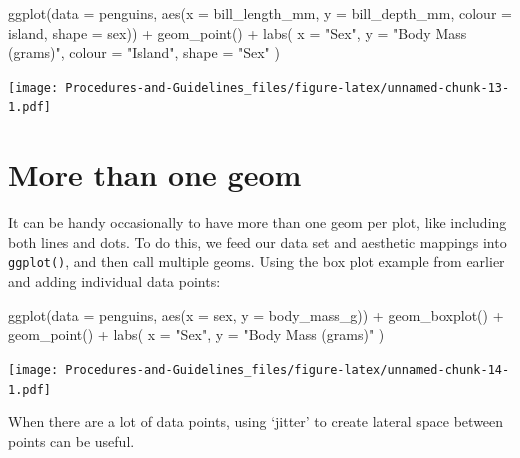 \documentclass[
]{book}
\newenvironment{Shaded}{\begin{snugshade}}{\end{snugshade}}
\newcommand{\AttributeTok}[1]{\textcolor[rgb]{0.77,0.63,0.00}{#1}}
\newcommand{\FunctionTok}[1]{\textcolor[rgb]{0.00,0.00,0.00}{#1}}
\newcommand{\NormalTok}[1]{#1}
\newcommand{\SpecialCharTok}[1]{\textcolor[rgb]{0.00,0.00,0.00}{#1}}
\newcommand{\StringTok}[1]{\textcolor[rgb]{0.31,0.60,0.02}{#1}}
\begin{document}
\begin{Shaded}
\begin{Highlighting}[]
\FunctionTok{ggplot}\NormalTok{(}\AttributeTok{data =}\NormalTok{ penguins, }\FunctionTok{aes}\NormalTok{(}\AttributeTok{x =}\NormalTok{ bill\_length\_mm, }\AttributeTok{y =}\NormalTok{ bill\_depth\_mm, }\AttributeTok{colour =}\NormalTok{ island, }\AttributeTok{shape =}\NormalTok{ sex)) }\SpecialCharTok{+}
  \FunctionTok{geom\_point}\NormalTok{() }\SpecialCharTok{+}
  \FunctionTok{labs}\NormalTok{(}
    \AttributeTok{x =} \StringTok{"Sex"}\NormalTok{,}
    \AttributeTok{y =} \StringTok{"Body Mass (grams)"}\NormalTok{,}
    \AttributeTok{colour =} \StringTok{"Island"}\NormalTok{,}
    \AttributeTok{shape =} \StringTok{"Sex"}
\NormalTok{  )}
\end{Highlighting}
\end{Shaded}

\texttt{[image: Procedures-and-Guidelines\_files/figure-latex/unnamed-chunk-13-1.pdf]}

\hypertarget{more-than-one-geom}{%
\section{More than one geom}\label{more-than-one-geom}}

It can be handy occasionally to have more than one geom per plot, like including both lines and dots. To do this, we feed our data set and aesthetic mappings into \texttt{ggplot()}, and then call multiple geoms. Using the box plot example from earlier and adding individual data points:

\begin{Shaded}
\begin{Highlighting}[]
\FunctionTok{ggplot}\NormalTok{(}\AttributeTok{data =}\NormalTok{ penguins, }\FunctionTok{aes}\NormalTok{(}\AttributeTok{x =}\NormalTok{ sex, }\AttributeTok{y =}\NormalTok{ body\_mass\_g)) }\SpecialCharTok{+}
  \FunctionTok{geom\_boxplot}\NormalTok{() }\SpecialCharTok{+}
  \FunctionTok{geom\_point}\NormalTok{() }\SpecialCharTok{+}
  \FunctionTok{labs}\NormalTok{(}
    \AttributeTok{x =} \StringTok{"Sex"}\NormalTok{,}
    \AttributeTok{y =} \StringTok{"Body Mass (grams)"}
\NormalTok{  )}
\end{Highlighting}
\end{Shaded}

\texttt{[image: Procedures-and-Guidelines\_files/figure-latex/unnamed-chunk-14-1.pdf]}

When there are a lot of data points, using `jitter' to create lateral space between points can be useful.
\end{document}
